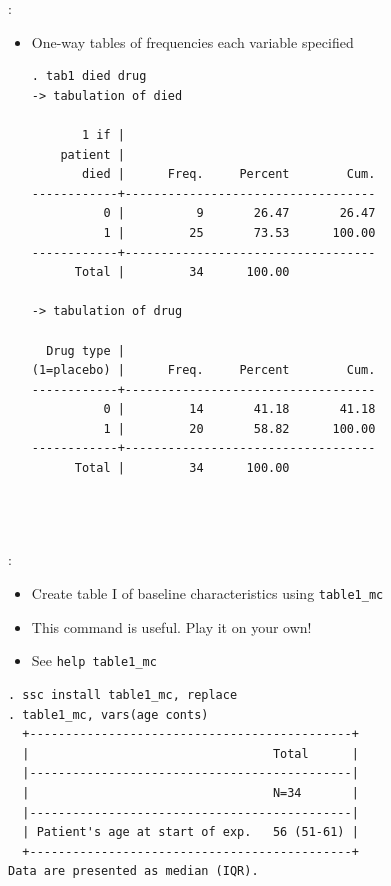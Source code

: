 \begin{frame}[fragile]{\secname: \subsecname}
\begin{itemize}	
\item One-way tables of frequencies each variable specified
\scriptsize
\begin{verbatim}
. tab1 died drug
-> tabulation of died  

       1 if |
    patient |
       died |      Freq.     Percent        Cum.
------------+-----------------------------------
          0 |          9       26.47       26.47
          1 |         25       73.53      100.00
------------+-----------------------------------
      Total |         34      100.00

-> tabulation of drug  

  Drug type |
(1=placebo) |      Freq.     Percent        Cum.
------------+-----------------------------------
          0 |         14       41.18       41.18
          1 |         20       58.82      100.00
------------+-----------------------------------
      Total |         34      100.00


	
\end{verbatim}
\end{itemize}
\end{frame}

\begin{frame}[fragile]{\secname: \subsecname}
\begin{itemize}
\item Create table I of baseline characteristics using \verb|table1_mc|
\item This command is useful. Play it on your own!
\item See \verb|help table1_mc|
\end{itemize}
\scriptsize
\begin{verbatim}
. ssc install table1_mc, replace
. table1_mc, vars(age conts)
  +---------------------------------------------+
  |                                  Total      |
  |---------------------------------------------|
  |                                  N=34       |
  |---------------------------------------------|
  | Patient's age at start of exp.   56 (51-61) |
  +---------------------------------------------+
Data are presented as median (IQR).
\end{verbatim}
\end{frame}	

